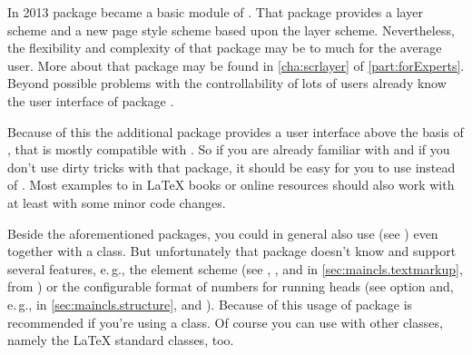 In 2013 package  became a basic
module of \KOMAScript. That package provides a layer scheme and a new page
style scheme based upon the layer scheme. Nevertheless, the flexibility and
complexity of that package may be to much for the average user. More about
that package may be found in \autoref{cha:scrlayer} of
\autoref{part:forExperts}. Beyond possible problems with the controllability
of  lots of users already know the user interface of package
.

Because of this the additional package  provides a
user interface above the basis of , that is mostly
compatible with . So if you are already familiar with
 and if you don't use dirty tricks with that package, it
should be easy for you to use  instead of
. Most examples to  in \LaTeX{} books or
online resources should also work with  at least
with some minor code changes.

Beside the aforementioned \KOMAScript{} packages, you could in general also
use  (see \cite{package:fancyhdr})
even together with a \KOMAScript{} class. But unfortunately that package
doesn't know and support several \KOMAScript{} features, e.\,g., the element
scheme (see , , and
 in \autoref{sec:maincls.textmarkup}, from
) or the configurable format of
numbers for running heads (see option  and, e.\,g.,
 in \autoref{sec:maincls.structure},
 and
). Because of this usage of
package  is recommended if you're using a
\KOMAScript{} class. Of course you can use  with
other classes, namely the \LaTeX{} standard classes, too.



